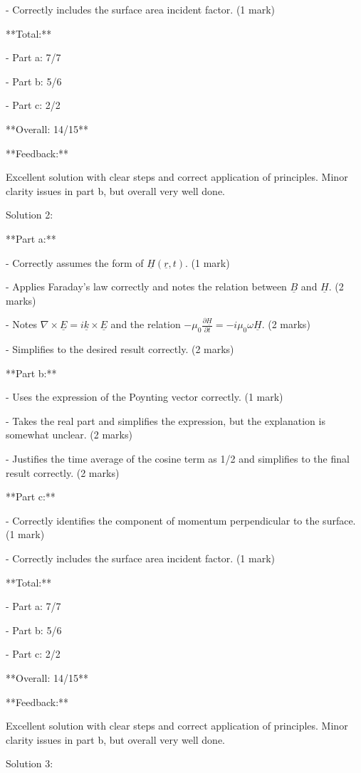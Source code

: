 \documentclass[a4paper,11pt]{article}
\begin{document}
- Correctly includes the surface area incident factor. (1 mark)

**Total:**

- Part a: 7/7

- Part b: 5/6

- Part c: 2/2

**Overall: 14/15**

**Feedback:**

Excellent solution with clear steps and correct application of principles. Minor clarity issues in part b, but overall very well done.

Solution 2:

**Part a:**

- Correctly assumes the form of \( \underline{H}(\underline{r}, t) \). (1 mark)

- Applies Faraday’s law correctly and notes the relation between \(\underline{B}\) and \(\underline{H}\). (2 marks)

- Notes \( \nabla \times \underline{E} = i \underline{k} \times \underline{E} \) and the relation \( - \mu_0 \frac{\partial \underline{H}}{\partial t} = - i \mu_0 \omega \underline{H} \). (2 marks)

- Simplifies to the desired result correctly. (2 marks)

**Part b:**

- Uses the expression of the Poynting vector correctly. (1 mark)

- Takes the real part and simplifies the expression, but the explanation is somewhat unclear. (2 marks)

- Justifies the time average of the cosine term as 1/2 and simplifies to the final result correctly. (2 marks)

**Part c:**

- Correctly identifies the component of momentum perpendicular to the surface. (1 mark)

- Correctly includes the surface area incident factor. (1 mark)

**Total:**

- Part a: 7/7

- Part b: 5/6

- Part c: 2/2

**Overall: 14/15**

**Feedback:**

Excellent solution with clear steps and correct application of principles. Minor clarity issues in part b, but overall very well done.

Solution 3:
\end{document}
